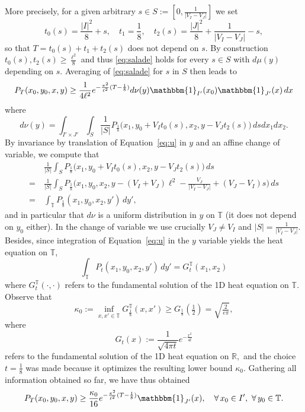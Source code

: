 \documentclass[12pt]{article}
\newcommand{\R}{\mathbb{R}}
\newcommand{\T}{\mathbb{T}}
\begin{document}
More precisely, for a given arbitrary $s \in S :=[0, \frac{1}{|V_I - V_J|}]$ we set 
$$
t_0(s) = \frac{|I|^2}{8} + s, \quad t_1 = \frac18, \quad  t_2(s) =
\frac{|J|^2}{8} + \frac{1}{|V_I -
V_J|} - s, 
$$ 
so that $T = t_0(s) + t_1 + t_2(s)$ does not depend on $s$. By construction 
$t_0(s),t_2(s)\geq \frac{\ell^2}{8}$ and thus \eqref{eq:salade} holds for every 
$s\in S$ with $d\mu(y)$ depending on $s$. Averaging of
\eqref{eq:salade} for $s$ in $S$  then leads to 
\begin{equation}\label{eq:salade2}
P_T(x_0,y_0,x,y)\\ 
	\geq \frac{1}{4\ell^2}e^{-\frac{\pi^2}{\ell^2}(T-\frac{1}{8})}
 d\nu(y)  \mathbbm{1}_{I'}(x_0) \mathbbm{1}_{J'}(x)\, dx 
\end{equation}
where
$$
d\nu(y) = \int_{I' \times J'}\int_S \frac{1}{|S|}
P_{\frac18}\Big(x_1, y_0 + V_It_0(s), x_2, y - V_Jt_2(s)\Big)\, ds dx_1 dx_2.
$$
By invariance by translation of Equation~\eqref{eq:u} in $y$ and an affine change of
variable, we compute that
\begin{equation}\label{eq:dnu}\begin{split}
  &\frac{1}{|S|} \int_S P_{\frac18}\big(x_1, y_0+ V_It_0(s), x_2, y -V_Jt_2(s)\big)\, ds\\
=\ &\frac{1}{|S|} \int_S P_{\frac18}\Big(x_1, y_0, x_2, y -(V_I + V_J)\ell^2 - \tfrac{V_J}{|V_I -
V_J|} + (V_J- V_I)s\Big)\, ds\\
=\ & \int_\T P_{\frac18}(x_1, y_0, x_2, y')\, dy',   
\end{split}\end{equation}
and in particular that $d\nu$ is a uniform distribution in $y$ on $\T$ (it does not depend
on $y_0$ either). In the change of variable we use crucially $V_J\neq V_I$ and 
$|S|=\frac{1}{|V_I-V_J|}$. Besides, since integration of Equation~\eqref{eq:u} in the $y$ 
variable yields the heat equation on $\T$, 
$$
\int_\T P_{t}(x_1, y_0, x_2, y')\, dy' = G_t^\T(x_1, x_2)
$$
where $G_t^\T(\cdot,\cdot)$ refers to the fundamental solution of 
the 1D heat equation on $\T$. Observe that  
\begin{equation}\label{eq:borneGtore}
\kappa_0 := \inf_{x,x' \in \T} 
	G_\frac18^\T(x,x') \geq G_\frac18(\tfrac 12) = \sqrt{\tfrac{2}{e\pi}},
\end{equation}
where
$$
G_t(x) := \frac{1}{\sqrt{4\pi t}} e^{-\frac{x^2}{4t}}
$$
refers to the fundamental solution of the 1D heat equation
on $\R,$ and the choice $t = \frac{1}{8}$ was made because it optimizes the
resulting lower bound $\kappa_0$.  
Gathering all information obtained so far, we have thus obtained 
\begin{equation}\label{eq:saladecuite}
P_T(x_0, y_0, x,y) \geq \frac{\kappa_0}{16}
	e^{-\frac{\pi^2}{\ell^2}(T-\frac{1}{8})}
\mathbbm{1}_{J'}(x), \quad \forall\, x_0 \in I', \ \forall\, y_0 \in \T.
\end{equation}
\end{document}
